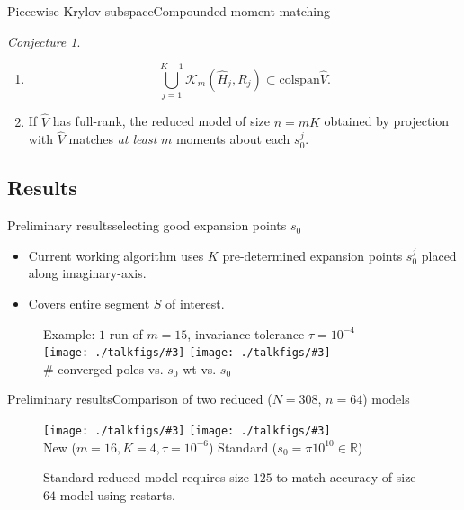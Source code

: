 \documentclass{beamer}
\newcommand{\R}{\mathbb{R}}
\newcommand{\A}{\widehat{H}}
\newcommand{\bigO}[1]{\mathcal{O}\left( #1 \right)}
\newcommand{\krylov}[3]{\mathcal{K}_{#1}\left({#2},{#3} \right)}
\theoremstyle{remark}
\newtheorem*{conjecture*}{Conjecture}
\newcommand{\putfig}[3][{}]{\texttt{[image: ./talkfigs/\#3]}} %
\begin{document}
\begin{frame}{Piecewise Krylov subspace}{Compounded moment matching}
\begin{conjecture*}
 \begin{enumerate}
    \item
		\[\bigcup_{j=1}^{K-1}\krylov{m}{\A_j}{R_j} \subset \text{colspan} \widehat{V}. \]
	
	\item If $\widehat{V}$ has full-rank, the reduced model of size $n=mK$ obtained 
	by projection with $\widehat{V}$ matches \emph{at least} $m$ moments about
	each $s_0^j$.
  
  \end{enumerate}
\end{conjecture*}
\end{frame}




\subsection{Results}
\begin{frame}{Preliminary results}{selecting good expansion points $s_0$}
	\begin{itemize}
	\item Current working algorithm uses $K$ pre-determined expansion points 
			$s_0^j$ placed along imaginary-axis. 
	\item Covers entire segment $S$ of interest.
	\end{itemize}
	
	\begin{figure}[htbp]
			\centering
			Example: $1$ run of $m=15$, invariance tolerance $\tau=10^{-4}$\\
			\putfig{.48}{ex308s1_ncvrgd15_1e4.png}\hfill
			\putfig{.48}{ex308s1_wt_15_1e4.png}\\
			\hfill\# converged poles vs. $s_0$\hfill {} \hfill wt vs. $s_0$\hfill {}
	\end{figure}
\end{frame} 



\begin{frame}{Preliminary results}{Comparison of two reduced ($N=308$, $n=64$) models}
	\begin{figure}[htbp]
		\centering
		\putfig{.48}{ex308s1_m16r4_1e6_tfunc.png}\hfill
		\putfig{.50}{ex308s1_rmp64.png} \\
		\hfill New ($m=16, K=4, \tau=10^{-6}$) \hfill Standard ($s_0=\pi 10^{10}\in\R$)\hfill
	\caption{Standard reduced model requires size $125$ to match accuracy of size $64$ model 
	using restarts.}
	\end{figure}
\end{frame}
\end{document}
